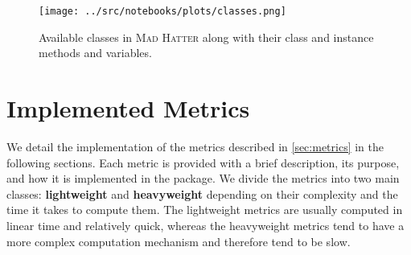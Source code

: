 \begin{figure}[htbp]
    \centering
    \texttt{[image: ../src/notebooks/plots/classes.png]}
    \caption{Available classes in \textsc{Mad Hatter} along with their class and instance methods and variables.}\label{fig:classes_methods}
\end{figure}

\section{Implemented Metrics}
We detail the implementation of the metrics described in \ref{sec:metrics} in the following sections. Each metric is provided with a brief description, its purpose, and how it is implemented in the package. We divide the metrics into two main classes: \textbf{lightweight} and \textbf{heavyweight} depending on their complexity and the time it takes to compute them. The lightweight metrics are usually computed in linear time and relatively quick, whereas the heavyweight metrics tend to have a more complex computation mechanism and therefore tend to be slow. 

